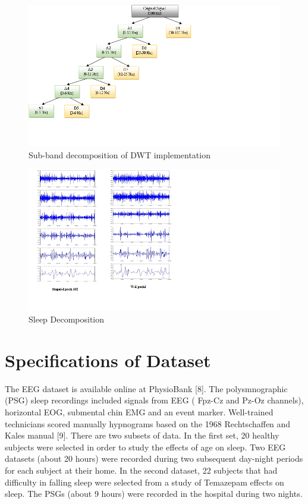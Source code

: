 \documentclass[12pt,letterpaper]{article}
\begin{document}
\begin{figure}

\includegraphics[width=1\textwidth]{DWT.png}

\caption{Sub-band decomposition of DWT implementation}
\end{figure}
\begin{figure}

\includegraphics[width=1\textwidth]{stages.png}

\caption{Sleep Decomposition}
\end{figure}
\section*{Specifications of Dataset}

The EEG dataset is available online at PhysioBank [8]. The polysmnographic (PSG) sleep recordings included signals from EEG ( Fpz-Cz and Pz-Oz channels), horizontal EOG, submental chin EMG and an event marker. Well-trained technicians scored manually hypnograms based on the 1968 Rechtschaffen and Kales manual [9].
There are two subsets of data. In the first set, 20 healthy subjects were selected in order to study the effects of age on sleep. Two EEG datasets (about 20 hours) were recorded during two subsequent day-night periods for each subject at their home. In the second dataset, 22 subjects that had difficulty in falling sleep were selected from a study of Temazepam effects on sleep. The PSGs (about 9 hours) were recorded in the hospital during two nights.
\end{document}
